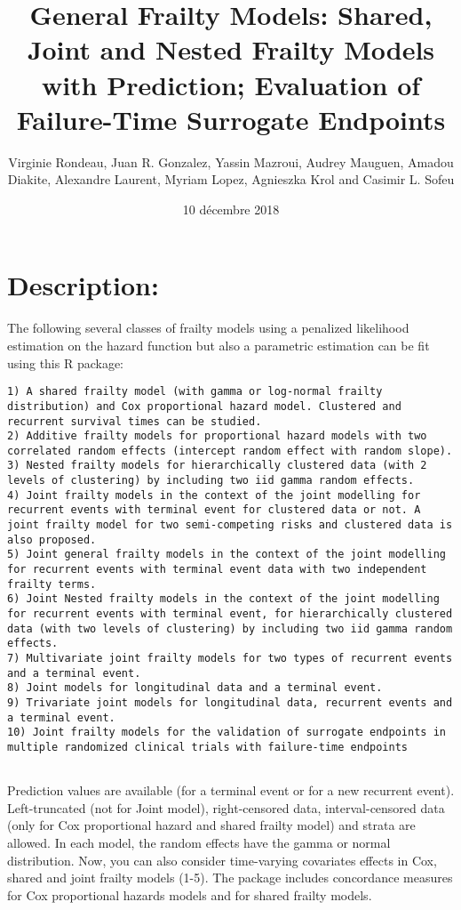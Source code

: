 \documentclass[]{article}
\title{General Frailty Models: Shared, Joint and Nested Frailty Models with
Prediction; Evaluation of Failure-Time Surrogate Endpoints}
\author{Virginie Rondeau, Juan R. Gonzalez, Yassin Mazroui, Audrey Mauguen,
Amadou Diakite, Alexandre Laurent, Myriam Lopez, Agnieszka Krol and
Casimir L. Sofeu}
\date{10 décembre 2018}
\begin{document}
\maketitle

\section{Description:}\label{description}

The following several classes of frailty models using a penalized
likelihood estimation on the hazard function but also a parametric
estimation can be fit using this R package:

\begin{verbatim}
1) A shared frailty model (with gamma or log-normal frailty distribution) and Cox proportional hazard model. Clustered and recurrent survival times can be studied.
2) Additive frailty models for proportional hazard models with two correlated random effects (intercept random effect with random slope).
3) Nested frailty models for hierarchically clustered data (with 2 levels of clustering) by including two iid gamma random effects.
4) Joint frailty models in the context of the joint modelling for recurrent events with terminal event for clustered data or not. A joint frailty model for two semi-competing risks and clustered data is also proposed.
5) Joint general frailty models in the context of the joint modelling for recurrent events with terminal event data with two independent frailty terms.
6) Joint Nested frailty models in the context of the joint modelling for recurrent events with terminal event, for hierarchically clustered data (with two levels of clustering) by including two iid gamma random effects.
7) Multivariate joint frailty models for two types of recurrent events and a terminal event.
8) Joint models for longitudinal data and a terminal event.
9) Trivariate joint models for longitudinal data, recurrent events and a terminal event. 
10) Joint frailty models for the validation of surrogate endpoints in multiple randomized clinical trials with failure-time endpoints 
    
\end{verbatim}

Prediction values are available (for a terminal event or for a new
recurrent event). Left-truncated (not for Joint model), right-censored
data, interval-censored data (only for Cox proportional hazard and
shared frailty model) and strata are allowed. In each model, the random
effects have the gamma or normal distribution. Now, you can also
consider time-varying covariates effects in Cox, shared and joint
frailty models (1-5). The package includes concordance measures for Cox
proportional hazards models and for shared frailty models.
\end{document}
